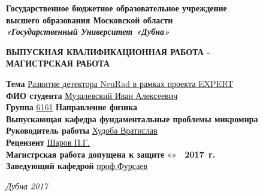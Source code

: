 	\thispagestyle{empty}
	
	\begin{center}
		{\large\bf Государственное бюджетное образовательное учреждение} \\[1.0ex]
		{\large\bf высшего  образования Московской области}\\[1.0ex]
		{\large\bf\itshape «Государственный Университет «Дубна» }
	\end{center}
	\centerline{\hrulefill\hrulefill}
	
	\vspace{2.9cm}
	
	\begin{center}
		\large\bf ВЫПУСКНАЯ КВАЛИФИКАЦИОННАЯ РАБОТА -\\
		МАГИСТРСКАЯ РАБОТА
	\end{center}
	
	\vspace{2.9cm}
	
	\noindent
	{{\bf Тема}\quad
		\underline{Развитие детектора NeuRad в рамках проекта EXPERT}}\\
	
	\noindent
	{{\bf ФИО студента}\quad
		\underline{Музалевский Иван Алексеевич}}\\
	
	\noindent
	{{\bf Группа} \quad \underline{6161}\quad
		{\bf Направление физика}}\\
	
	\noindent
	{\bf Выпускающая кафедра фундаментальные проблемы микромира}\\
	
	\noindent
	{{\bf Руководитель работы} \hspace{1cm} \underline{
			Худоба Вратислав} \quad \underline{\hspace{3cm}}}\\
	
	\noindent
	{{\bf Рецензент}  \quad  \underline{Шаров П.Г.} \quad
		\underline{\hspace{3cm}}} \\
	
	\noindent
	{{\bf Магистрская работа допущена к защите}  \quad
		«\underline{\hspace{1cm}}» \underline{\hspace{2cm}}\,\, {\bf 2017\, г.}} 
	\\
	
	\noindent
	{{\bf Заведующий кафедрой} \hspace{3cm} \quad
		\underline{проф.Фурсаев}}
	
	\vspace{2.3cm}
	
	\centerline{\itshape{Дубна 2017}}
	
	\newpage
	\tableofcontents
	\newpage